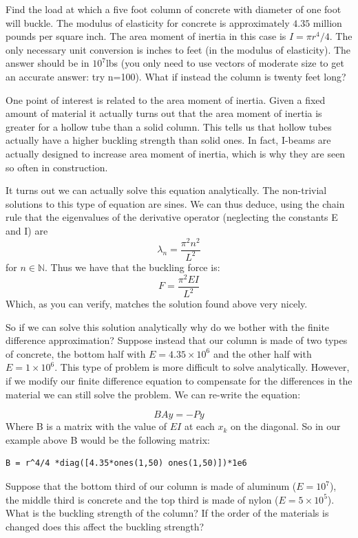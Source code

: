 \begin{problem}
Find the load at which a five foot column of concrete with diameter of one foot will buckle. The modulus of elasticity for concrete is approximately $4.35$ million pounds per square inch. The area moment of inertia in this case is $I = \pi r^4/4$. The only necessary unit conversion is inches to feet (in the modulus of elasticity). The answer should be in $10^7$lbs (you only need to use vectors of moderate size to get an accurate answer: try n=100). What if instead the column is twenty feet long?
\end{problem}

One point of interest is related to the area moment of inertia. Given a fixed amount of material it actually turns out that the area moment of inertia is greater for a hollow tube than a solid column. This tells us that hollow tubes actually have a higher buckling strength than solid ones. In fact, I-beams are actually designed to increase area moment of inertia, which is why they are seen so often in construction.

It turns out we can actually solve this equation analytically. The non-trivial solutions to this type of equation are sines. We can thus deduce, using the chain rule that the eigenvalues of the derivative operator (neglecting the constants E and I) are
\[
\lambda_n = \frac{\pi^2 n^2}{L^2}
\]
for $n \in \mathbb{N}$. Thus we have that the buckling force is:
\[
F = \frac{\pi^2 EI}{L^2}
\]
Which, as you can verify, matches the solution found above very nicely.

So if we can solve this solution analytically why do we bother with the finite difference approximation? Suppose instead that our column is made of two types of concrete, the bottom half with $E = 4.35\times 10^6$ and the other half with$E = 1 \times 10^6$. This type of problem is more difficult to solve analytically. However, if we modify our finite difference equation to compensate for the differences in the material we can still solve the problem. We can re-write the equation:

\[
B A y = -Py
\]
Where B is a matrix with the value of $E I$ at each $x_k$ on the diagonal. So in our example above B would be the following matrix:

\begin{matlab}
\begin{lstlisting}[style=matlab]
B = r^4/4 *diag([4.35*ones(1,50) ones(1,50)])*1e6
\end{lstlisting}
\end{matlab}

\begin{problem}
Suppose that the bottom third of our column is made of aluminum ($E = 10^7$), the middle third is concrete and the top third is made of nylon ($E = 5\times 10^5$). What is the buckling strength of the column? If the order of the materials is changed does this affect the buckling strength?
\end{problem}



